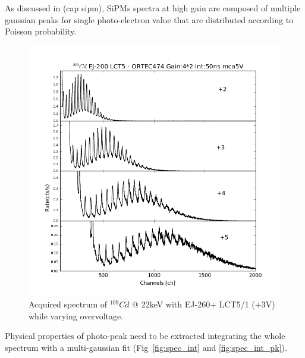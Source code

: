 \documentclass[10pt,a4paper, openany]{book}
\begin{document}
As discussed in (cap sipm), SiPMs spectra at high gain are composed of multiple gaussian peaks for single photo-electron value that are distributed according to Poisson probability.\\

\begin{figure}[!h]
\begin{center}
\includegraphics[scale=0.5]{imm/conf.png}
\end{center}
\caption{Acquired spectrum of $^{109}Cd$ @ 22keV with EJ-260+ LCT5/1 (+3V) while varying overvoltage.} 
\label{fig:es_conf}
\end{figure}

Physical properties of photo-peak need to be extracted integrating the whole spectrum with a multi-gaussian fit (Fig~\ref{fig:spec_int} and \ref{fig:spec_int_pk}).
\end{document}
